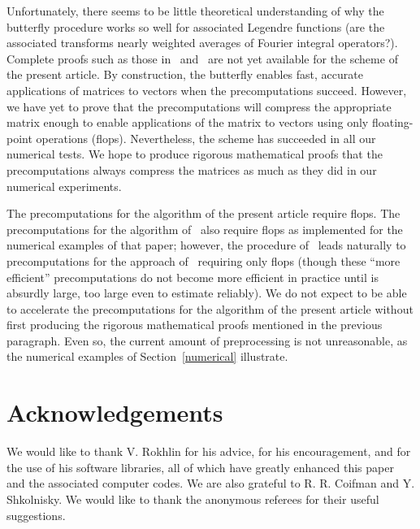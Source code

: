 \documentclass[final,3p,times]{elsarticle}
\begin{document}
Unfortunately, there seems to be little theoretical understanding
of why the butterfly procedure works so well for associated Legendre functions
(are the associated transforms nearly weighted averages
of Fourier integral operators?).
Complete proofs such as those in~\cite{oneil-woolfe-rokhlin}
and~\cite{tygert_sph} are not yet available for the scheme
of the present article.
By construction, the butterfly enables fast, accurate
applications of matrices to vectors when the precomputations succeed.
However, we have yet to prove that the precomputations
will compress the appropriate  matrix
enough to enable applications of the matrix to vectors
using only  floating-point operations (flops).
Nevertheless, the scheme has succeeded in all our numerical tests.
We hope to produce rigorous mathematical proofs that the precomputations
always compress the matrices as much as they did in our numerical experiments.

The precomputations for the algorithm of the present article
require  flops.
The precomputations for the algorithm of~\cite{tygert_sph} also
require  flops as implemented for the numerical examples
of that paper; however, the procedure of~\cite{gu-eisenstat95}
leads naturally to precomputations for the approach of~\cite{tygert_sph}
requiring only  flops
(though these ``more efficient'' precomputations do not become more efficient
in practice until  is absurdly large, too large even to estimate reliably).
We do not expect to be able to accelerate the precomputations
for the algorithm of the present article without first producing
the rigorous mathematical proofs mentioned in the previous paragraph.
Even so, the current amount of preprocessing is not unreasonable,
as the numerical examples of Section~\ref{numerical} illustrate.



\section*{Acknowledgements}

We would like to thank V. Rokhlin for his advice, for his encouragement,
and for the use of his software libraries,
all of which have greatly enhanced this paper
and the associated computer codes.
We are also grateful to R. R. Coifman and Y. Shkolnisky.
We would like to thank the anonymous referees for their useful suggestions.
\end{document}
